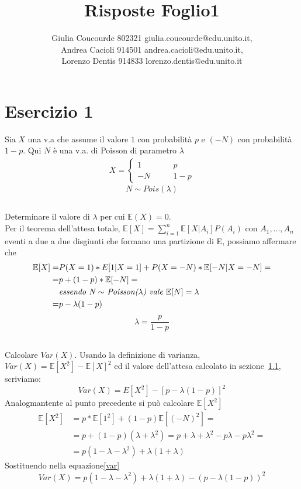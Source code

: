 \documentclass[a4paper]{article}
\newcommand{\E}[0]{\mathbb{E}}
\begin{document}
\author{Giulia Coucourde 802321 giulia.coucourde@edu.unito.it,\\ Andrea Cacioli 914501 andrea.cacioli@edu.unito.it,\\ Lorenzo Dentis 914833 lorenzo.dentis@edu.unito.it}
\title{Risposte Foglio1}
\maketitle
\section{Esercizio 1}
Sia $X$ una v.a che assume il valore $1$ con probabilità $p$ e $(-N)$ con probabilità $1 - p$. Qui $N$ è una v.a. di Poisson di parametro $\lambda$
\begin{align}
	X=
	\begin{cases}
		1 \qquad & p\\
		-N \qquad & 1-p
	\end{cases}
\end{align}
$$N \sim Pois(\lambda)$$ 
\subsection{}
\label{SEC:1.a}
Determinare il valore di $\lambda$ per cui $\E(X) = 0$.\\
Per il teorema dell'attesa totale, $\E[X] = \sum_{i=1}^n\E[X|A_i]P(A_i)$ con $A_1, ..., A_n$ eventi a due a due disgiunti che formano una partizione di E, possiamo affermare che
\begin{align*}
	\E[X] = & P(X=1) * E[1 | X=1] + P(X=-N)*\E[-N | X= -N]=\\
	= & p + (1-p) * \E[-N]=\\
	  & \text{\textit{essendo N $\sim$ Poisson($\lambda$) vale $\E[N] = \lambda$}}\\
	= & p - \lambda(1-p) 
\end{align*}
$$\lambda = \frac{p}{1-p}$$
\subsection{}
Calcolare $Var(X)$.
Usando la definizione di varianza, $Var(X) = \E[X^2] - \E[X]^2$  ed il valore dell'attesa calcolato in sezione~\ref{SEC:1.a}, scriviamo:
\begin{equation}\label{var}Var(X) =  E[X^2] - [p - \lambda(1-p)]^2\end{equation} 
Analogmantente al punto precedente si può calcolare $\E[X^2]$
\begin{align*}
	\E[X^2] &= p* \E[1^2] + (1-p)\E[(-N)^2]=\\
		&= p + (1-p)(\lambda + \lambda^2)= p+\lambda +\lambda^2 -p\lambda - p\lambda^2 =\\
		&= p(1-\lambda -\lambda^2) + \lambda(1+\lambda) 
\end{align*}
Sostituendo nella equazione\eqref{var}
$$Var(X) =  p(1-\lambda -\lambda^2) + \lambda(1+\lambda) - (p - \lambda(1-p))^2 $$
\end{document}
